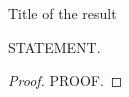 \begin{appendixitem}{Title of the result}
    \begin{theorem}
        STATEMENT.
    \end{theorem}
    \begin{proof}
        PROOF.
    \end{proof}
\end{appendixitem}
